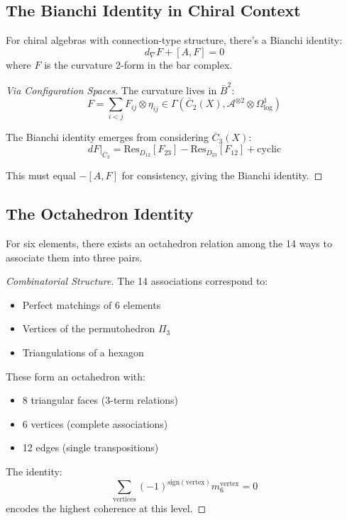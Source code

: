 \subsection{The Bianchi Identity in Chiral Context}

\begin{theorem}
For chiral algebras with connection-type structure, there's a Bianchi identity:
$$d_\nabla F + [A, F] = 0$$
where $F$ is the curvature 2-form in the bar complex.
\end{theorem}

\begin{proof}[Via Configuration Spaces]
The curvature lives in $\bar{B}^2$:
$$F = \sum_{i<j} F_{ij} \otimes \eta_{ij} \in \Gamma(\overline{C}_2(X), \mathcal{A}^{\otimes 2} \otimes \Omega^1_{\text{log}})$$

The Bianchi identity emerges from considering $\overline{C}_3(X)$:
$$dF|_{\overline{C}_3} = \text{Res}_{D_{12}}[F_{23}] - \text{Res}_{D_{23}}[F_{12}] + \text{cyclic}$$

This must equal $-[A,F]$ for consistency, giving the Bianchi identity.
\end{proof}

\subsection{The Octahedron Identity}

\begin{theorem}
For six elements, there exists an octahedron relation among the 14 ways to associate them into three pairs.
\end{theorem}

\begin{proof}[Combinatorial Structure]
The 14 associations correspond to:
\begin{itemize}
\item Perfect matchings of 6 elements
\item Vertices of the permutohedron $\Pi_3$
\item Triangulations of a hexagon
\end{itemize}

These form an octahedron with:
\begin{itemize}
\item 8 triangular faces (3-term relations)
\item 6 vertices (complete associations)
\item 12 edges (single transpositions)
\end{itemize}

The identity:
$$\sum_{\text{vertices}} (-1)^{\text{sign}(\text{vertex})} m_6^{\text{vertex}} = 0$$
encodes the highest coherence at this level.
\end{proof}

